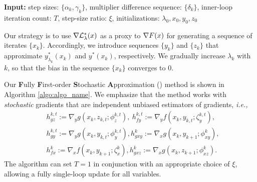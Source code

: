 \begin{algorithm}[t]
    \caption{\algname}
    \label{algo:algo_name}
    
    {{\bf Input:} step sizes: $\{\alpha_k, \gamma_k\}$, multiplier difference sequence: $\{\delta_k\}$, inner-loop iteration count: $T$, step-size ratio: $\xi$, initializations: $\lambda_0, x_0, y_0, z_0$}
    \begin{algorithmic}[1]
            \ENDFOR
        \ENDFOR
    \end{algorithmic}
\end{algorithm}

Our strategy is to use $\nabla \mathcal{L}_{\lambda}^*(x)$ as a proxy to $\nabla F(x)$ for generating a sequence of iterates $\{x_k\}$. 
Accordingly, we introduce sequences $\{y_k\}$ and $\{z_k\}$ that approximate $y_{\lambda_k}^*(x_k)$ and $y^*(x_k)$, respectively. 
We gradually increase $\lambda_k$ with $k$, so that the bias in the sequence $\{x_k\}$ converges to 0. 



Our \textbf{F}ully \textbf{F}irst-order \textbf{S}tochastic \textbf{A}pproximation (\algname) method is shown in Algorithm \ref{algo:algo_name}. 
We emphasize that the method works with \emph{stochastic} gradients that are independent unbiased estimators of gradients, {\it i.e.,} 
\begin{align*}
    &h_{gz}^{k,t} := \nabla_y g(x_k, z_{k,t}; \phi_{z}^{k,t}), \ h_{fy}^{k,t} := \nabla_y f(x_k, y_{k,t}; \zeta_{y}^{k,t}), \\
    &h_{gy}^{k,t} := \nabla_y g(x_k, y_{k,t}; \phi_{y}^{k,t}), h_{gxy}^k:= \nabla_{x} g(x_k, y_{k+1}; \phi_{xy}^k), \\
    & h_{fx}^k := \nabla_x f(x_k, y_{k+1}; \zeta_{x}^k), h_{gxz}^k := \nabla_x g(x_k, z_{k+1}; \phi_{xz}^k).
\end{align*}
The algorithm can set $T=1$ in conjunction with an appropriate choice of $\xi$, allowing a fully single-loop update for all variables. 






